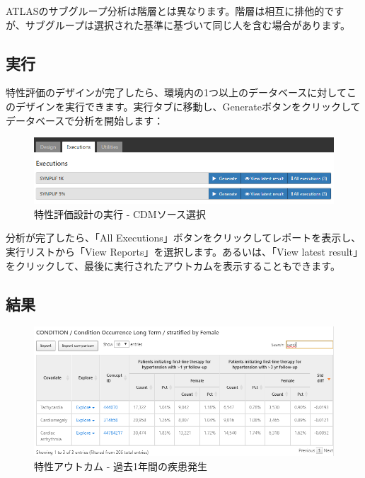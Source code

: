 \documentclass[
  11pt]{book}
\makeatletter
\newenvironment{kframe}{%
\medskip{}
\setlength{\fboxsep}{.8em}
 \def\at@end@of@kframe{}%
 \ifinner\ifhmode%
  \def\at@end@of@kframe{\end{minipage}}%
  \begin{minipage}{\columnwidth}%
 \fi\fi%
 \def\FrameCommand##1{\hskip\@totalleftmargin \hskip-\fboxsep
 \colorbox{myShadeColor}{##1}\hskip-\fboxsep
     \hskip-\linewidth \hskip-\@totalleftmargin \hskip\columnwidth}%
 \MakeFramed {\advance\hsize-\width
   \@totalleftmargin\z@ \linewidth\hsize
   \@setminipage}}%
 {\par\unskip\endMakeFramed%
 \at@end@of@kframe}
\newenvironment{rmdblock}[1]
  {
  \begin{itemize}
  \renewcommand{\labelitemi}{
    \raisebox{-.7\height}[0pt][0pt]{
      {\setkeys{Gin}{width=3em,keepaspectratio}\texttt{[image: images/\#1]}}
    }
  }
  \setlength{\fboxsep}{1em}
  \begin{kframe}
  \item
  }
  {
  \end{kframe}
  \end{itemize}
  }
\newenvironment{rmdimportant}
  {\begin{rmdblock}{important}}
  {\end{rmdblock}}
\theoremstyle{definition}
\theoremstyle{definition}
\theoremstyle{definition}
\theoremstyle{definition}
\theoremstyle{remark}
\makeatother
\begin{document}
\begin{rmdimportant}
ATLASのサブグループ分析は階層とは異なります。階層は相互に排他的ですが、サブグループは選択された基準に基づいて同じ人を含む場合があります。
\end{rmdimportant}

\subsection{実行}\label{ux5b9fux884c}

特性評価のデザインが完了したら、環境内の1つ以上のデータベースに対してこのデザインを実行できます。実行タブに移動し、Generateボタンをクリックしてデータベースで分析を開始します：

\begin{figure}

{\centering \includegraphics[width=1\linewidth]{images/Characterization/atlasCharacterizationExecutions} 

}

\caption{特性評価設計の実行 - CDMソース選択}\label{fig:atlasCharacterizationExecutions}
\end{figure}

分析が完了したら、「All Executions」ボタンをクリックしてレポートを表示し、実行リストから「View Reports」を選択します。あるいは、「View latest result」をクリックして、最後に実行されたアウトカムを表示することもできます。

\subsection{結果}\label{ux7d50ux679c}

\begin{figure}

{\centering \includegraphics[width=1\linewidth]{images/Characterization/atlasCharacterizationResultsSummary} 

}

\caption{特性アウトカム - 過去1年間の疾患発生}\label{fig:atlasCharacterizationResultsSummary}
\end{figure}
\end{document}
